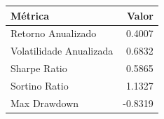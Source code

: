 \begin{tabular}{lr}
\toprule
M\'etrica & Valor \\
\midrule
Retorno Anualizado & 0.4007 \\
Volatilidade Anualizada & 0.6832 \\
Sharpe Ratio & 0.5865 \\
Sortino Ratio & 1.1327 \\
Max Drawdown & -0.8319 \\
\bottomrule
\end{tabular}